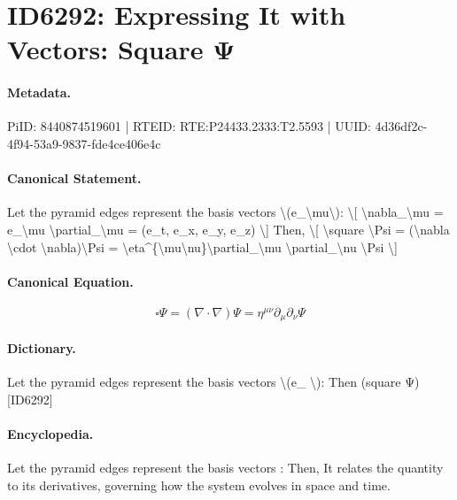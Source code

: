 \section*{ID6292: Expressing It with Vectors: Square Ψ}
\paragraph{Metadata.}
PiID: 8440874519601 | RTEID: RTE:P24433.2333:T2.5593 | UUID: 4d36df2c-4f94-53a9-9837-fde4ce406e4c

\paragraph{Canonical Statement.}
Let the pyramid edges represent the basis vectors \textbackslash{}(e\_\textbackslash{}mu\textbackslash{}): \textbackslash{}[ \textbackslash{}nabla\_\textbackslash{}mu = e\_\textbackslash{}mu \textbackslash{}partial\_\textbackslash{}mu = (e\_t, e\_x, e\_y, e\_z) \textbackslash{}] Then, \textbackslash{}[ \textbackslash{}square \textbackslash{}Psi = (\textbackslash{}nabla \textbackslash{}cdot \textbackslash{}nabla)\textbackslash{}Psi = \textbackslash{}eta\textasciicircum{}\{\textbackslash{}mu\textbackslash{}nu\}\textbackslash{}partial\_\textbackslash{}mu \textbackslash{}partial\_\textbackslash{}nu \textbackslash{}Psi \textbackslash{}]

\paragraph{Canonical Equation.}
\[
\square \Psi = (\nabla \cdot \nabla)\Psi = \eta^{\mu\nu}\partial_\mu \partial_\nu \Psi
\]

\paragraph{Dictionary.}
Let the pyramid edges represent the basis vectors \textbackslash{}(e\_ \textbackslash{}): Then (square Ψ) [ID6292]

\paragraph{Encyclopedia.}
Let the pyramid edges represent the basis vectors : Then, It relates the quantity to its derivatives, governing how the system evolves in space and time.

